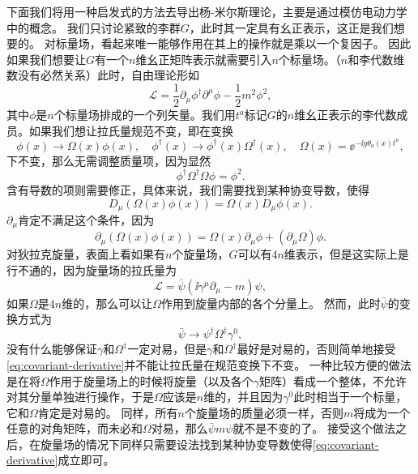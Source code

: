 下面我们将用一种启发式的方法去导出杨-米尔斯理论，主要是通过模仿电动力学中的概念。
我们只讨论紧致的李群$G$，此时其一定具有幺正表示，这正是我们想要的。
对标量场，看起来唯一能够作用在其上的操作就是乘以一个复因子。
因此如果我们想要让$G$有一个$n$维幺正矩阵表示就需要引入$n$个标量场。（$n$和李代数维数没有必然关系）此时，自由理论形如
\[
    \mathcal{L} = \frac{1}{2} \partial_\mu \phi^\dagger \partial^\mu \phi - \frac{1}{2} m^2 \phi^2,
\]
其中$\phi$是$n$个标量场排成的一个列矢量。我们用$t^a$标记$G$的$n$维幺正表示的李代数成员。如果我们想让拉氏量规范不变，即在变换
\[
    \phi(x) \to \Omega(x) \phi(x), \quad \phi^\dagger(x) \to \phi^\dagger(x) \Omega^\dagger(x), \quad \Omega(x) = \ee^{- \ii g \theta_a(x) t^a},
\]
下不变，那么无需调整质量项，因为显然
\[
    \phi^\dagger \Omega^\dagger \Omega \phi = \phi^2.
\]
含有导数的项则需要修正，具体来说，我们需要找到某种协变导数，使得
\begin{equation}
    D_\mu (\Omega(x) \phi(x)) = \Omega(x) D_\mu \phi(x).
    \label{eq:covariant-derivative}
\end{equation}
$\partial_\mu$肯定不满足这个条件，因为
\[
    \partial_\mu (\Omega(x) \phi(x)) = \Omega(x) \partial_\mu \phi + (\partial_\mu \Omega) \phi.
\]
对狄拉克旋量，表面上看如果有$n$个旋量场，$G$可以有$4n$维表示，但是这实际上是行不通的，因为旋量场的拉氏量为
\[
    \mathcal{L} = \bar{\psi} (\ii \gamma^\mu \partial_\mu - m) \psi,
\]
如果$\Omega$是$4n$维的，那么可以让$\Omega$作用到旋量内部的各个分量上。
然而，此时$\bar{\psi}$的变换方式为
\[
    \bar{\psi} \to \psi^\dagger \Omega^\dagger \gamma^0,
\]
没有什么能够保证$\gamma$和$\Omega^\dagger$一定对易，但是$\gamma$和$\Omega^\dagger$最好是对易的，否则简单地接受\eqref{eq:covariant-derivative}并不能让拉氏量在规范变换下不变。
一种比较方便的做法是在将$\Omega$作用于旋量场上的时候将旋量（以及各个$\gamma$矩阵）看成一个整体，不允许对其分量单独进行操作，于是$\Omega$应该是$n$维的，并且因为$\gamma^0$此时相当于一个标量，它和$\Omega$肯定是对易的。
同样，所有$n$个旋量场的质量必须一样，否则$m$将成为一个任意的对角矩阵，而未必和$\Omega$对易，那么$\bar{\psi} m \psi$就不是不变的了。
接受这个做法之后，在旋量场的情况下同样只需要设法找到某种协变导数使得\eqref{eq:covariant-derivative}成立即可。


